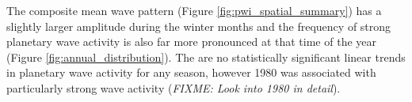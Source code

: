 The composite mean wave pattern (Figure \ref{fig:pwi_spatial_summary}) has a slightly larger amplitude during the winter months and the frequency of strong planetary wave activity is also far more pronounced at that time of the year (Figure \ref{fig:annual_distribution}). The are no statistically significant linear trends in planetary wave activity for any season, however 1980 was associated with particularly strong wave activity (\textit{FIXME: Look into 1980 in detail}).
